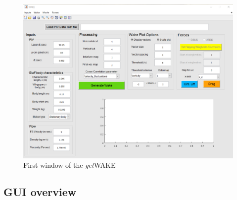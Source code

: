\documentclass[12pt,a4paper]{article}
\begin{document}
\begin{figure}[ht!]
	\centering
	\includegraphics[width=\textwidth]{openwindow}
	\caption{First window of the \textit{get}WAKE}
	\label{fig:GUI-open_window}
\end{figure}	

\newpage
\subsection{GUI overview}
\end{document}
